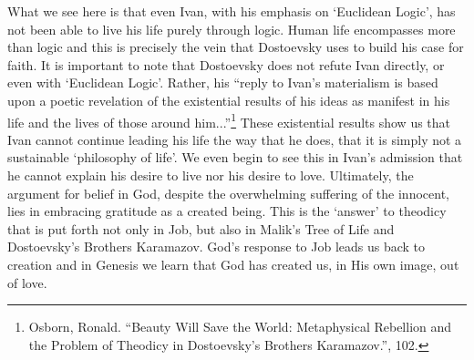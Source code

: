 What we see here is that even Ivan, with his emphasis on `Euclidean Logic', has not been able to live his life purely through logic. Human life encompasses more than logic and this is precisely the vein that Dostoevsky uses to build his case for faith. It is important to note that Dostoevsky does not refute Ivan directly, or even with `Euclidean Logic'. Rather, his ``reply to Ivan's materialism is based upon a poetic revelation of the existential results of his ideas as manifest in his life and the lives of those around him...''\footnote{Osborn, Ronald. ``Beauty Will Save the World: Metaphysical Rebellion and the Problem of Theodicy in Dostoevsky's Brothers Karamazov.'', 102.} These existential results show us that Ivan cannot continue leading his life the way that he does, that it is simply not a sustainable `philosophy of life'. We even begin to see this in Ivan's admission that he cannot explain his desire to live nor his desire to love. Ultimately, the argument for belief in God, despite the overwhelming suffering of the innocent, lies in embracing gratitude as a created being. This is the `answer' to theodicy that is put forth not only in Job, but also in Malik's Tree of Life and Dostoevsky's Brothers Karamazov. God's response to Job leads us back to creation and in Genesis we learn that God has created us, in His own image, out of love.

